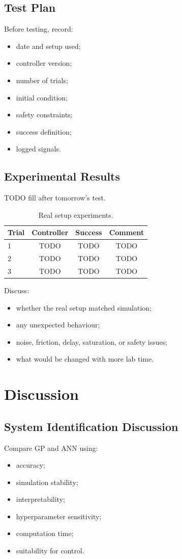 \documentclass[conference]{IEEEtran}
\begin{document}
\subsection{Test Plan}
Before testing, record:
\begin{itemize}
    \item date and setup used;
    \item controller version;
    \item number of trials;
    \item initial condition;
    \item safety constraints;
    \item success definition;
    \item logged signals.
\end{itemize}

\subsection{Experimental Results}
TODO fill after tomorrow's test.

\begin{table}[h]
\centering
\caption{Real setup experiments.}
\begin{tabular}{lccc}
\toprule
Trial & Controller & Success & Comment \\
\midrule
1 & TODO & TODO & TODO \\
2 & TODO & TODO & TODO \\
3 & TODO & TODO & TODO \\
\bottomrule
\end{tabular}
\end{table}

Discuss:
\begin{itemize}
    \item whether the real setup matched simulation;
    \item any unexpected behaviour;
    \item noise, friction, delay, saturation, or safety issues;
    \item what would be changed with more lab time.
\end{itemize}

\section{Discussion}

\subsection{System Identification Discussion}
Compare GP and ANN using:
\begin{itemize}
    \item accuracy;
    \item simulation stability;
    \item interpretability;
    \item hyperparameter sensitivity;
    \item computation time;
    \item suitability for control.
\end{itemize}
\end{document}
